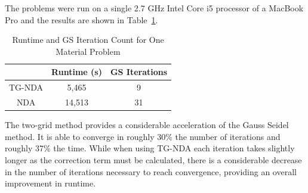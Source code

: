 The problems were run on a single 2.7 GHz Intel Core i5 processor of a MacBook Pro and the results are shown in Table~\ref{tab:onemat}.
\begin{table}[!htb]
\centering
\caption{Runtime and GS Iteration Count for One Material Problem}
    \label{tab:onemat}
\begin{center}
    \begin{tabular}{|c|c|c|}
    \hline
    & Runtime (s) & GS Iterations \\
    \hline

    TG-NDA & 5,465 & 9 \\
    NDA & 14,513 & 31 \\
    \hline
    \end{tabular}
\end{center}
\end{table}

The two-grid method provides a considerable acceleration of the Gauss Seidel method. It is able to converge in roughly 30\% the number of iterations and roughly 37\% the time. While when using TG-NDA each iteration takes slightly longer as the correction term must be calculated, there is a considerable decrease in the number of iterations necessary to reach convergence, providing an overall improvement in runtime. 


